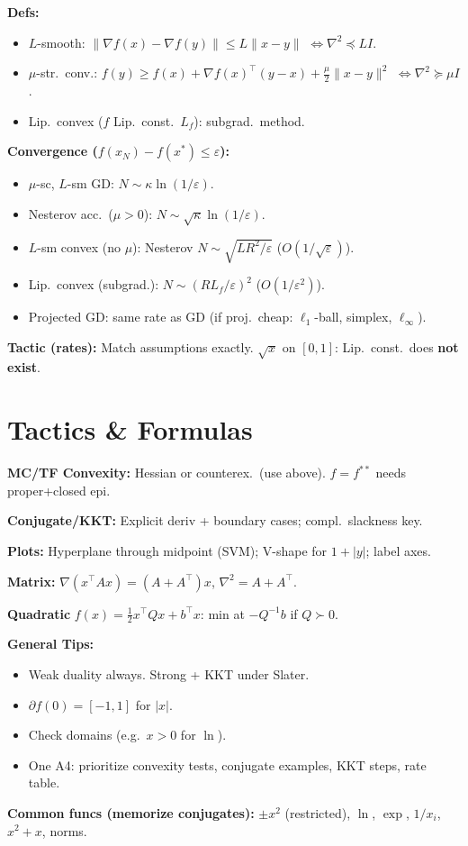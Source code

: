 \textbf{Defs:}
\begin{itemize}
  \item \(L\)-smooth: \(\|\nabla f(x)-\nabla f(y)\|\le L\|x-y\|\)
    \(\iff\nabla^2\preceq LI\).
  \item \(\mu\)-str.\ conv.: \(f(y)\ge f(x)+\nabla
    f(x)^\top(y-x)+\frac\mu2\|x-y\|^2\) \(\iff\nabla^2\succeq\mu I\).
  \item Lip.\ convex (\(f\) Lip.\ const.\ \(L_f\)): subgrad.\ method.
\end{itemize}

\textbf{Convergence (\(f(x_N)-f(x^*)\le\varepsilon\)):}
\begin{itemize}
  \item \(\mu\)-sc, \(L\)-sm GD: \(N\sim\kappa\ln(1/\varepsilon)\).
  \item Nesterov acc.\ (\(\mu>0\)): \(N\sim\sqrt{\kappa}\ln(1/\varepsilon)\).
  \item \(L\)-sm convex (no \(\mu\)): Nesterov
    \(N\sim\sqrt{LR^2/\varepsilon}\) (\(O(1/\sqrt{\varepsilon})\)).
  \item Lip.\ convex (subgrad.): \(N\sim(RL_f/\varepsilon)^2\)
    (\(O(1/\varepsilon^2)\)).
  \item Projected GD: same rate as GD (if proj.\ cheap:
    \(\ell_1\)-ball, simplex, \(\ell_\infty\)).
\end{itemize}

\textbf{Tactic (rates):} Match assumptions exactly. \(\sqrt{x}\) on
\([0,1]\): Lip.\ const.\ does \textbf{not exist}.

\section*{Tactics \& Formulas}
\textbf{MC/TF Convexity:} Hessian or counterex.\ (use above).
\(f=f^{**}\) needs proper+closed epi.

\textbf{Conjugate/KKT:} Explicit deriv + boundary cases; compl.\ slackness key.

\textbf{Plots:} Hyperplane through midpoint (SVM); V-shape for
\(1+|y|\); label axes.

\textbf{Matrix:} \(\nabla(x^\top A x)=(A+A^\top)x\), \(\nabla^2=A+A^\top\).

\textbf{Quadratic} \(f(x)=\frac12 x^\top Qx + b^\top x\): min at
\(-Q^{-1}b\) if \(Q\succ0\).

\textbf{General Tips:}
\begin{itemize}
  \item Weak duality always. Strong + KKT under Slater.
  \item \(\partial f(0)=[-1,1]\) for \(|x|\).
  \item Check domains (e.g.\ \(x>0\) for \(\ln\)).
  \item One A4: prioritize convexity tests, conjugate examples, KKT
    steps, rate table.
\end{itemize}

\vspace{1mm}
\textbf{Common funcs (memorize conjugates):} \(\pm x^2\)
(restricted), \(\ln\), \(\exp\), \(1/x_i\), \(x^2+x\), norms.

